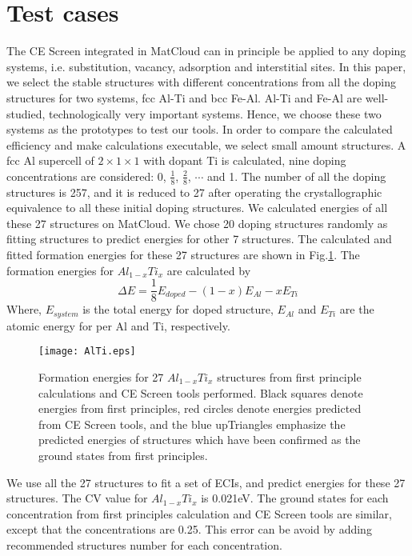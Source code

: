 \documentclass[aps,preprint,amsmath,amssymb]{revtex4}
\begin{document}
\section{Test cases}
The CE Screen integrated in MatCloud can in principle be applied to any doping systems,
i.e. substitution, vacancy, adsorption and interstitial sites. In this paper, we select the stable structures
with different concentrations from all the doping structures for two systems, fcc Al-Ti and bcc Fe-Al.
Al-Ti and Fe-Al are well-studied, technologically very important systems\cite{Chakraborty2010,Ghosh2008}.
Hence, we choose these two systems as the prototypes to test our tools.
In order to compare the calculated efficiency and make calculations executable, we select small amount structures.
A fcc Al supercell of $2\times1\times1$ with dopant Ti is calculated, nine doping concentrations are considered:
0, $\frac{1}{8}$, $\frac{2}{8}$, $\cdots$ and 1.
The number of all the doping structures is 257, and it is reduced to 27 after operating the crystallographic equivalence to all
these initial doping structures. We calculated energies of all these 27 structures on MatCloud.
We chose 20 doping structures randomly as fitting structures to predict energies for other 7 structures.
The calculated and fitted formation energies for these 27 structures are shown in Fig.\ref{Al-Ti}.
The formation energies for $Al_{1-x}Ti_{x}$ are calculated by
\begin{equation}\label{Al-Ti-E}
  \Delta{E}=\frac{1}{8}E_{doped}-(1-x)E_{Al}-xE_{Ti}
\end{equation}
Where, $E_{system}$ is the total energy for doped structure, $E_{Al}$ and $E_{Ti}$ are the atomic energy for per Al and Ti, respectively.
\begin{figure}
\texttt{[image: AlTi.eps]}
\caption{Formation energies for 27 $Al_{1-x}Ti_{x}$ structures from first principle calculations and CE Screen tools performed.
Black squares denote energies from first principles, red circles denote energies predicted from CE Screen tools, and the blue upTriangles
emphasize the predicted energies of structures which have been confirmed as the ground states from first principles.}\label{Al-Ti}
\end{figure}
We use all the 27 structures to fit a set of ECIs, and predict energies for these 27 structures. The CV value for $Al_{1-x}Ti_{x}$ is 0.021eV.
The ground states for each concentration from first principles calculation and CE Screen
tools are similar, except that the concentrations are 0.25. This error can be avoid by adding recommended structures number for each concentration.
\end{document}

